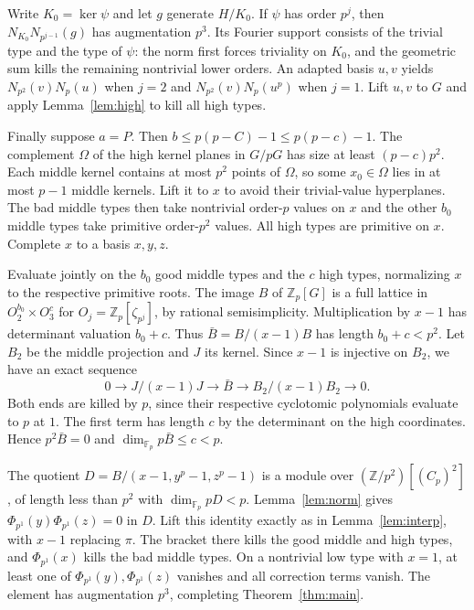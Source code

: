 \documentclass[11pt]{article}
\newcommand{\Z}{\mathbb Z}
\newcommand{\F}{\mathbb F}
\newcommand{\Ph}[1]{\Phi_{p^{#1}}}
\begin{document}
Write $K_0=\ker\psi$ and let $g$ generate $H/K_0$. If $\psi$ has
order $p^j$, then $N_{K_0}N_{p^{j-1}}(g)$ has augmentation $p^3$.
Its Fourier support consists of the trivial type and the type of
$\psi$: the norm first forces triviality on $K_0$, and the geometric
sum kills the remaining nontrivial lower orders. An adapted basis
$u,v$ yields $N_{p^2}(v)N_p(u)$ when $j=2$ and
$N_{p^2}(v)N_p(u^p)$ when $j=1$. Lift $u,v$ to $G$ and apply
Lemma~\ref{lem:high} to kill all high types.

Finally suppose $a=P$. Then $b\le p(p-C)-1\le p(p-c)-1$.
The complement $\Omega$ of the high kernel planes in $G/pG$ has size
at least $(p-c)p^2$. Each middle kernel contains at most $p^2$ points
of $\Omega$, so some $x_0\in\Omega$ lies in at most $p-1$ middle
kernels. Lift it to $x$ to avoid their trivial-value hyperplanes. The
bad middle types then take nontrivial order-$p$ values on $x$ and the
other $b_0$ middle types take primitive order-$p^2$ values. All high
types are primitive on $x$. Complete $x$ to a basis $x,y,z$.

Evaluate jointly on the $b_0$ good middle types and the $c$ high
types, normalizing $x$ to the respective primitive roots. The image
$B$ of $\Z_p[G]$ is a full lattice in
$O_2^{b_0}\times O_3^c$ for $O_j=\Z_p[\zeta_{p^j}]$, by rational
semisimplicity. Multiplication by $x-1$ has determinant valuation
$b_0+c$. Thus $\bar B=B/(x-1)B$ has length $b_0+c<p^2$.
Let $B_2$ be the middle projection and $J$ its kernel. Since $x-1$
is injective on $B_2$, we have an exact sequence
\[
 0\longrightarrow J/(x-1)J\longrightarrow\bar B
 \longrightarrow B_2/(x-1)B_2\longrightarrow0.
\]
Both ends are killed by $p$, since their respective cyclotomic
polynomials evaluate to $p$ at $1$. The first term has length $c$ by
the determinant on the high coordinates. Hence $p^2\bar B=0$ and
$\dim_{\F_p}p\bar B\le c<p$.

The quotient $D=B/(x-1,y^p-1,z^p-1)$ is a module over
$(\Z/p^2)[(C_p)^2]$, of length less than $p^2$ with
$\dim_{\F_p}pD<p$. Lemma~\ref{lem:norm} gives
$\Ph{1}(y)\Ph{1}(z)=0$ in $D$. Lift this identity exactly as in
Lemma~\ref{lem:interp}, with $x-1$ replacing $\pi$. The bracket there
kills the good middle and high types, and $\Ph{1}(x)$ kills the bad
middle types. On a nontrivial low type with $x=1$, at least one of
$\Ph{1}(y),\Ph{1}(z)$ vanishes and all correction terms vanish.
The element has augmentation $p^3$, completing Theorem~\ref{thm:main}.
\end{document}
